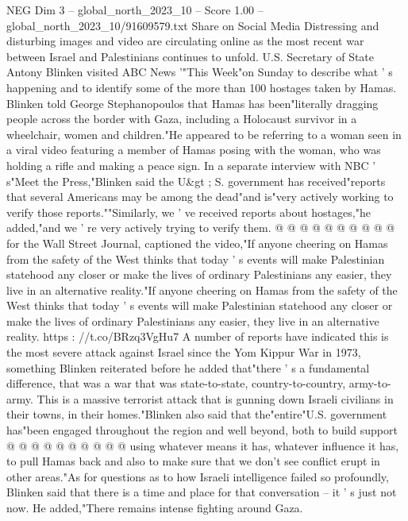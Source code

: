 \begin{textsample}{NEG Dim 3 – global\_north\_2023\_10 – Score 1.00 – global\_north\_2023\_10/91609579.txt}  \label{ex:f3_neg_189}
Share on Social Media Distressing and disturbing images and video are circulating online as the most recent war between Israel and Palestinians continues to unfold.
U.S.
Secretary of State Antony Blinken visited ABC News '"This Week"on Sunday to describe what ' s happening and to identify some of the more than 100 hostages taken by Hamas.
Blinken told George Stephanopoulos that Hamas has been"literally dragging people across the border with Gaza, including a Holocaust survivor in a wheelchair, women and children."He appeared to be referring to a woman seen in a viral video featuring a member of Hamas posing with the woman, who was holding a rifle and making a peace sign.
In a separate interview with NBC ' s"Meet the Press,"Blinken said the U\&gt ; S. government has received"reports that several Americans may be among the dead"and is"very actively working to verify those reports.""Similarly, we ' ve received reports about hostages,"he added,"and we ' re very actively trying to verify them. @ @ @ @ @ @ @ @ @ @ for the Wall Street Journal, captioned the video,"If anyone cheering on Hamas from the safety of the West thinks that today ' s events will make Palestinian statehood any closer or make the lives of ordinary Palestinians any easier, they live in an alternative reality."If anyone cheering on Hamas from the safety of the West thinks that today ' s events will make Palestinian statehood any closer or make the lives of ordinary Palestinians any easier, they live in an alternative reality. https : //t.co/BRzq3VgHu7 A number of reports have indicated this is the most severe attack against Israel since the Yom Kippur War in 1973, something Blinken reiterated before he added that"there ' s a fundamental difference, that was a war that was state-to-state, country-to-country, army-to-army.
This is a massive terrorist attack that is gunning down Israeli civilians in their towns, in their homes."Blinken also said that the"entire"U.S. government has"been engaged throughout the region and well beyond, both to build support @ @ @ @ @ @ @ @ @ @ using whatever means it has, whatever influence it has, to pull Hamas back and also to make sure that we don't see conflict erupt in other areas."As for questions as to how Israeli intelligence failed so profoundly, Blinken said that there is a time and place for that conversation -- it ' s just not now.
He added,"There remains intense fighting around Gaza.

\end{textsample}
